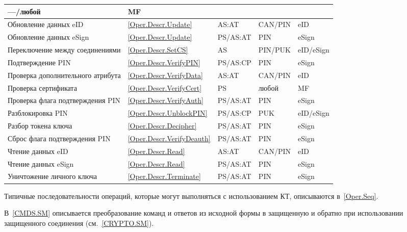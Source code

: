 \begin{table}[p]
\begin{tabular}{|p{7.5cm}|p{1.3cm}|p{2.6cm}|p{1.8cm}| p{1.7cm}|}
---/любой & MF \\ 
\hline
Обновление данных eID & \ref{Oper.Descr.Update} & AS:AT & CAN/PIN & eID \\
\hline
Обновление данных eSign & \ref{Oper.Descr.Update} & PS/AS:AT & PIN & eSign \\
\hline
Переключение между соединениями & \ref{Oper.Descr.SetCS} & AS & PIN/PUK & 
eID/eSign \\ 
\hline
Подтверждение PIN & \ref{Oper.Descr.VerifyPIN} & PS/AS:CP & PIN & eSign \\
\hline
Проверка дополнительного атрибута& \ref{Oper.Descr.VerifyData}& AS:AT & CAN/PIN 
& eID \\ 
\hline
Проверка сертификата & \ref{Oper.Descr.VerifyCert} & PS & любой & MF \\
\hline
Проверка флага подтверждения PIN & \ref{Oper.Descr.VerifyAuth} & PS/AS:AT & PIN 
& eSign \\ 
\hline
Разблокировка PIN & \ref{Oper.Descr.UnblockPIN} & PS/AS:CP  & PUK & eID/eSign\\ 
\hline
Разбор токена ключа & 
\ref{Oper.Descr.Decipher} & PS/AS:AT & PIN & eSign \\
\hline
Сброс флага подтверждения PIN & \ref{Oper.Descr.VerifyDeauth} & 
PS/AS:AT  & PIN & eSign \\ 
\hline
Чтение данных eID & \ref{Oper.Descr.Read} & AS:AT & CAN/PIN & eID \\
\hline
Чтение данных eSign & \ref{Oper.Descr.Read} & PS/AS:AT& PIN & eSign \\
\hline
Уничтожение личного ключа & \ref{Oper.Descr.Terminate} & PS/AS:AT  & PIN & eSign \\
\hline
\end{tabular}
\end{table}

Типичные последовательности операций, которые могут выполняться 
с использованием КТ, описываются в~\ref{Oper.Seq}.

В~\ref{CMDS.SM} описывается преобразование команд и ответов из исходной формы в 
защищенную и обратно при использовании защищенного соединения (см.~\ref{CRYPTO.SM}). 



